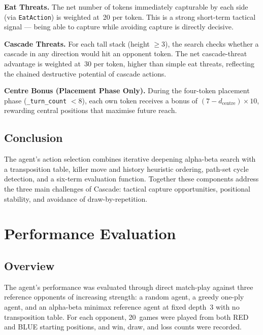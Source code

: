 \documentclass[10pt,a4paper]{article}
\begin{document}
\textbf{Eat Threats.}
The net number of tokens immediately capturable by each side (via \texttt{EatAction}) is weighted at~20 per token. This is a strong short-term tactical signal --- being able to capture while avoiding capture is directly decisive.

\textbf{Cascade Threats.}
For each tall stack (height $\geq 3$), the search checks whether a cascade in any direction would hit an opponent token. The net cascade-threat advantage is weighted at~30 per token, higher than simple eat threats, reflecting the chained destructive potential of cascade actions.

\textbf{Centre Bonus (Placement Phase Only).}
During the four-token placement phase (\texttt{\_turn\_count} $< 8$), each own token receives a bonus of $(7 - d_{\text{centre}}) \times 10$, rewarding central positions that maximise future reach.

\subsection{Conclusion}

The agent's action selection combines iterative deepening alpha-beta search with a transposition table, killer move and history heuristic ordering, path-set cycle detection, and a six-term evaluation function. Together these components address the three main challenges of Cascade: tactical capture opportunities, positional stability, and avoidance of draw-by-repetition.

\section{Performance Evaluation}
\label{sec:performance}

\subsection{Overview}

The agent's performance was evaluated through direct match-play against three reference opponents of increasing strength: a random agent, a greedy one-ply agent, and an alpha-beta minimax reference agent at fixed depth~3 with no transposition table. For each opponent, 20~games were played from both RED and BLUE starting positions, and win, draw, and loss counts were recorded.

\end{document}
